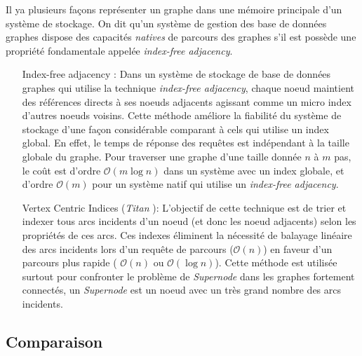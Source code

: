     Il ya plusieurs façons représenter un graphe dans une mémoire
    principale d'un système de stockage. On dit qu'un système de
    gestion des base de données graphes dispose des capacités
    \emph{natives} de parcours des graphes s'il est possède une
    propriété fondamentale appelée \emph{index-free adjacency}.

    

    \begin{itemize}
    \item [Index-free adjacency]: Dans un système de stockage de base
      de données graphes qui utilise la technique \emph{index-free
        adjacency}, chaque noeud maintient des références directs à
      ses noeuds adjacents agissant comme un micro index d'autres
      noeuds voisins. Cette méthode améliore la fiabilité du système
      de stockage d'une façon considérable comparant à cels qui
      utilise un index global. En effet, le temps de réponse des
      requêtes est indépendant à la taille globale du graphe. Pour
      traverser une graphe d'une taille donnée $n$ à $m$ pas, le coût
      est d'ordre $\mathcal{O}(m\log{}n)$ dans un système avec un
      index globale, et d'ordre $\mathcal{O}(m)$ pour un système natif
      qui utilise un \emph{index-free adjacency}.

      
    \item [Vertex Centric Indices] (\emph{Titan} \cite{vertexci}):
      L'objectif de cette technique est de trier et indexer tous arcs
      incidents d'un noeud (et donc les noeud adjacents) selon les
      propriétés de ces arcs. Ces indexes éliminent la nécessité de
      balayage linéaire des arcs incidents lors d'un requête de
      parcours ($\mathcal{O}(n)$) en faveur d'un parcours plus rapide
      ( $\mathcal{O}(n)$ ou $\mathcal{O}(\log{}n)$). Cette méthode est
      utilisée surtout pour confronter le problème de \emph{Supernode}
      dans les graphes fortement connectés, un \emph{Supernode} est un
      noeud avec un très grand nombre des arcs incidents.
    \end{itemize}


  \subsection{Comparaison}
  \label{sec:graphdb-comp}
\newpage



